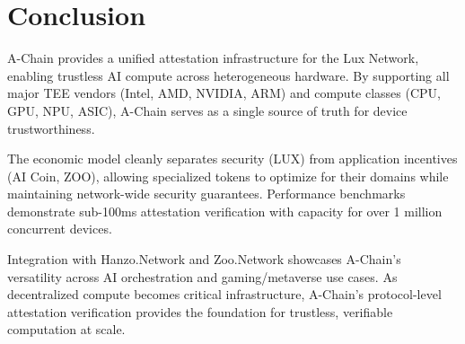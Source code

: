\section{Conclusion}


A-Chain provides a unified attestation infrastructure for the Lux Network, enabling trustless AI compute across heterogeneous hardware. By supporting all major TEE vendors (Intel, AMD, NVIDIA, ARM) and compute classes (CPU, GPU, NPU, ASIC), A-Chain serves as a single source of truth for device trustworthiness.

The economic model cleanly separates security (LUX) from application incentives (AI Coin, ZOO), allowing specialized tokens to optimize for their domains while maintaining network-wide security guarantees. Performance benchmarks demonstrate sub-100ms attestation verification with capacity for over 1 million concurrent devices.

Integration with Hanzo.Network and Zoo.Network showcases A-Chain's versatility across AI orchestration and gaming/metaverse use cases. As decentralized compute becomes critical infrastructure, A-Chain's protocol-level attestation verification provides the foundation for trustless, verifiable computation at scale.

